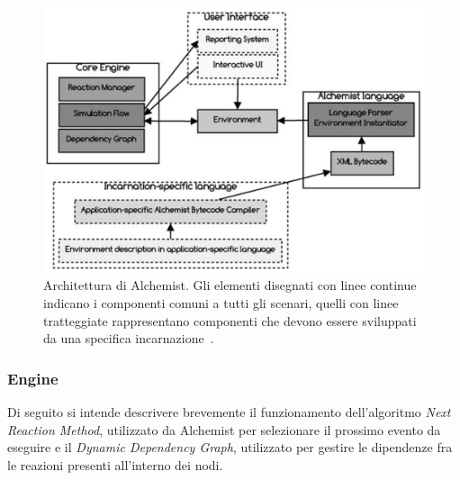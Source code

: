 \documentclass[12pt,a4paper,openright,twoside]{book}
\begin{document}
\begin{figure}
    \centering
    \includegraphics[width=.85\linewidth]{figures/discrete-event-simulation/alchemist-architecture.png}
    \caption{Architettura di Alchemist. Gli elementi disegnati con linee continue indicano i componenti comuni a tutti gli scenari, quelli con linee tratteggiate rappresentano componenti che devono essere sviluppati da una specifica incarnazione~\cite{DBLP:journals/jos/PianiniMV13}.}
    \label{fig:alchemist-architecture}
\end{figure}

\subsubsection{Engine}
Di seguito si intende descrivere brevemente il funzionamento dell'algoritmo \textit{Next Reaction Method}, utilizzato da Alchemist per selezionare il prossimo evento da eseguire e il \textit{Dynamic Dependency Graph}, utilizzato per gestire le dipendenze fra le reazioni presenti all'interno dei nodi. 
\end{document}
